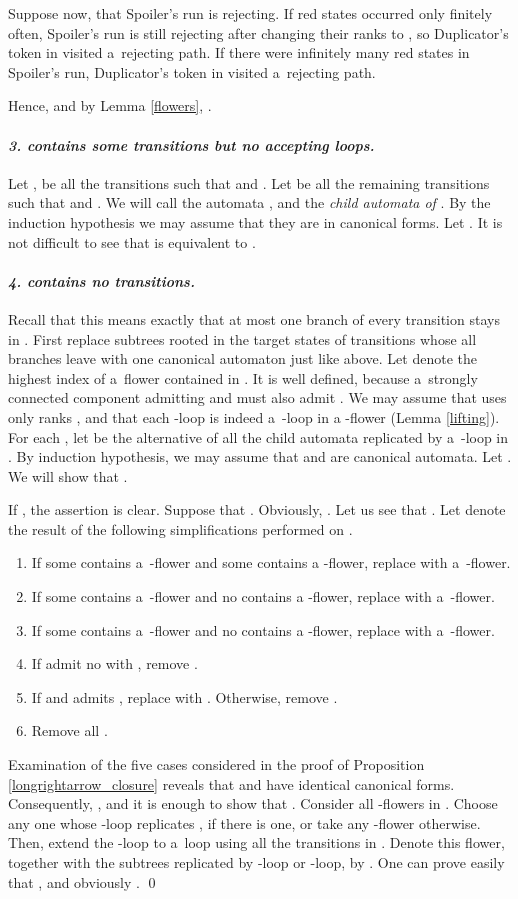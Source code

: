 \documentclass{LMCS}
\begin{document}
Suppose now, that Spoiler's run is rejecting. If red states occurred only finitely often, Spoiler's run is still rejecting after changing their ranks to , so Duplicator's token in  visited a~rejecting path. If there were infinitely many red states in Spoiler's run, Duplicator's token in  visited a~rejecting path. 

Hence,  and by Lemma \ref{flowers}, .

\paragraph{{\em 3.  contains some transitions but no accepting loops.}} Let ,  be all the transitions such that  and . Let   be all the remaining transitions such that   and . We will call the automata ,  and  the {\em child automata of }. By the induction hypothesis we may assume that they are in canonical forms. Let . It is not difficult to see that  is equivalent to . 

\paragraph{{\em 4.   contains no transitions. }} Recall that this means exactly  that at most one branch of every transition stays in . First replace subtrees rooted in the target states of transitions whose all branches leave  with one canonical automaton  just like above. Let  denote the highest index of a~flower contained in . It is well defined, because a~strongly connected component admitting   and  must also admit . We may assume that  uses only ranks , and that each -loop is indeed a~-loop in a -flower (Lemma \ref{lifting}).  For each , let  be the alternative of all the child automata replicated by a~-loop in . By induction hypothesis, we may assume that  and  are canonical automata. Let . We will show that .

If , the assertion is clear. Suppose that . Obviously, . Let us see that  . Let  denote the result of the following simplifications performed on .
\begin{enumerate}[]
\item If some  contains a~-flower and some  contains a -flower, replace  with a~-flower.
\item If some  contains a~-flower and no  contains a -flower, replace  with a~-flower.
\item If some  contains a~-flower and no  contains a -flower, replace  with a~-flower.
\item If  admit no  with , remove .
\item If  and  admits , replace  with . Otherwise, remove .
\item Remove all .
\end{enumerate}
  Examination of the five cases considered in the proof of Proposition
  \ref{longrightarrow_closure} reveals that  and  have
  identical canonical forms. Consequently, , and it is
  enough to show that . Consider all -flowers in . Choose any one whose -loop
  replicates , if there is one, or take any -flower otherwise. Then, extend the -loop to a~loop
  using all the transitions in . Denote this flower, together with
  the subtrees replicated by -loop or -loop, by
  . One can prove easily that , and obviously
  . \qed
\end{document}
